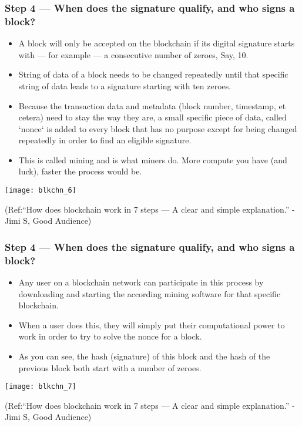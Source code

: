 \begin{frame}[fragile]\frametitle{Step 4 — When does the signature qualify, and who signs a block?}
\begin{itemize}
\item A block will only be accepted on the blockchain if its digital signature starts with — for example — a consecutive number of zeroes, Say, 10.
\item String of data of a block needs to be changed repeatedly until that specific string of data leads to a signature starting with ten zeroes. 
\item Because the transaction data and metadata (block number, timestamp, et cetera) need to stay the way they are, a small specific piece of data, called `nonce` is added to every block that has no purpose except for being changed repeatedly in order to find an eligible signature.
\item This is called mining and is what miners do. More compute you have (and luck), faster the process would be.
\end{itemize}

\begin{center}
\texttt{[image: blkchn\_6]}

{\tiny (Ref:``How does blockchain work in 7 steps — A clear and simple explanation.'' - Jimi S, Good Audience)}
\end{center}

\end{frame}

\begin{frame}[fragile]\frametitle{Step 4 — When does the signature qualify, and who signs a block?}
\begin{itemize}
\item Any user on a blockchain network can participate in this process by downloading and starting the according mining software for that specific blockchain. 
\item When a user does this, they will simply put their computational power to work in order to try to solve the nonce for a block.
\item As you can see, the hash (signature) of this block and the hash of the previous block both start with a number of zeroes. 
\end{itemize}

\begin{center}
\texttt{[image: blkchn\_7]}

{\tiny (Ref:``How does blockchain work in 7 steps — A clear and simple explanation.'' - Jimi S, Good Audience)}
\end{center}

\end{frame}

